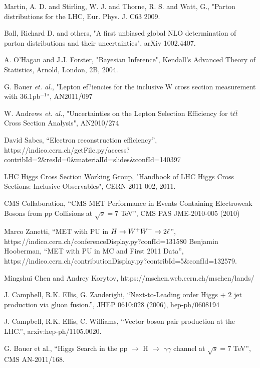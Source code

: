 Martin, A. D. and Stirling, W. J. and Thorne, R. S. and Watt, G., "Parton 
distributions for the LHC, Eur. Phys. J. C63 2009.

Ball, Richard D. and others, "A first unbiased global NLO determination 
of parton distributions and their uncertainties", arXiv 1002.4407.

A. O'Hagan and J.J. Forster, "Bayesian Inference", Kendall's Advanced Theory of Statistics, 
Arnold, London, 2B, 2004.

G. Bauer {\it et. al.}, "Lepton ef?iencies for the inclusive W cross section measurement with 36.1pb$^{-1}$", AN2011/097

W. Andrews {\it et. al.}, "Uncertainties on the Lepton Selection Efficiency for t$t\bar{t}$ Cross Section Analysis", AN2010/274

David Sabes, ``Electron reconstruction efficiency'', https://indico.cern.ch/getFile.py/access?contribId=2\&resId=0\&materialId=slides\&confId=140397

LHC Higgs Cross Section Working Group, "Handbook of LHC Higgs Cross Sections: 
Inclusive Observables", CERN-2011-002, 2011.

CMS Collaboration, ``CMS MET Performance in Events Containing Electroweak Bosons from pp Collisions at $\sqrt{s}=7$ TeV'', CMS PAS JME-2010-005 (2010)


Marco Zanetti, ``MET with PU in $H\to W^+W^-\to2\ell$'', https://indico.cern.ch/conferenceDisplay.py?confId=131580
Benjamin Hooberman, ``MET with PU in MC and First 2011 Data'', https://indico.cern.ch/contributionDisplay.py?contribId=5\&confId=132579. 


Mingshui Chen and Andrey Korytov, https://mschen.web.cern.ch/mschen/lands/

J. Campbell, R.K. Ellis, G. Zanderighi, ``Next-to-Leading order Higgs + 2 jet production via gluon fusion.'', JHEP 0610:028 (2006), hep-ph/0608194

J. Campbell, R.K. Ellis, C. Williams, ``Vector boson pair production at the LHC.'', arxiv:hep-ph/1105.0020.

G. Bauer et al., ``Higgs Search in the pp $\rightarrow$ H $\rightarrow$ $\gamma\gamma$ channel at $\sqrt{s}=7$ TeV'', CMS AN-2011/168. 

